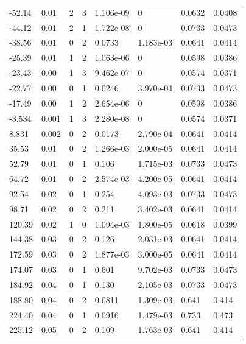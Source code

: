 \documentclass[preview]{standalone}
\begin{document}
{{\begin{tabular}{L{1.2cm}C{1.2cm} C{0.3cm}C{0.5cm} C{1.4cm}C{1.4cm} C{1.4cm}C{1.4cm}}
  -52.14  &  0.01  & 2     &  3 &  1.106e-09  & 0  & 0.0632 &  0.0408   \\ 
  -44.12  &  0.01  & 2     &  1 &  1.722e-08  & 0  & 0.0733 &  0.0473   \\ 
  -38.56  &  0.01  & 0     &  2 &  0.0733  & 1.183e-03  & 0.0641 &  0.0414   \\ 
  -25.39  &  0.01  & 1     &  2 &  1.063e-06  & 0  & 0.0598 &  0.0386   \\ 
  -23.43  &  0.00  & 1     &  3 &  9.462e-07  & 0  & 0.0574 &  0.0371   \\ 
  -22.77  &  0.00  & 0     &  1 &  0.0246  & 3.970e-04  & 0.0733 &  0.0473   \\ 
  -17.49  &  0.00  & 1     &  2 &  2.654e-06  & 0  & 0.0598 &  0.0386   \\ 
  -3.534  &  0.001  & 1     &  3 &  2.280e-08  & 0  & 0.0574 &  0.0371   \\ 
  8.831  &  0.002  & 0     &  2 &  0.0173  & 2.790e-04  & 0.0641 &  0.0414   \\ 
  35.53  &  0.01  & 0     &  2 &  1.266e-03  & 2.000e-05  & 0.0641 &  0.0414   \\ 
  52.79  &  0.01  & 0     &  1 &  0.106  & 1.715e-03  & 0.0733 &  0.0473   \\ 
  64.72  &  0.01  & 0     &  2 &  2.574e-03  & 4.200e-05  & 0.0641 &  0.0414   \\ 
  92.54  &  0.02  & 0     &  1 &  0.254  & 4.093e-03  & 0.0733 &  0.0473   \\ 
  98.71  &  0.02  & 0     &  2 &  0.211  & 3.402e-03  & 0.0641 &  0.0414   \\ 
  120.39  &  0.02  & 1     &  0 &  1.094e-03  & 1.800e-05  & 0.0618 &  0.0399   \\ 
  144.38  &  0.03  & 0     &  2 &  0.126  & 2.031e-03  & 0.0641 &  0.0414   \\ 
  172.59  &  0.03  & 0     &  2 &  1.877e-03  & 3.000e-05  & 0.0641 &  0.0414   \\ 
  174.07  &  0.03  & 0     &  1 &  0.601  & 9.702e-03  & 0.0733 &  0.0473   \\ 
  184.92  &  0.04  & 0     &  1 &  0.130  & 2.105e-03  & 0.0733 &  0.0473   \\ 
  188.80  &  0.04  & 0     &  2 &  0.0811  & 1.309e-03  & 0.641 &  0.414   \\ 
  224.40  &  0.04  & 0     &  1 &  0.0916  & 1.479e-03  & 0.733 &  0.473   \\ 
  225.12  &  0.05  & 0     &  2 &  0.109  & 1.763e-03  & 0.641 &  0.414   \\ 

\end{tabular}}}
\end{document}
